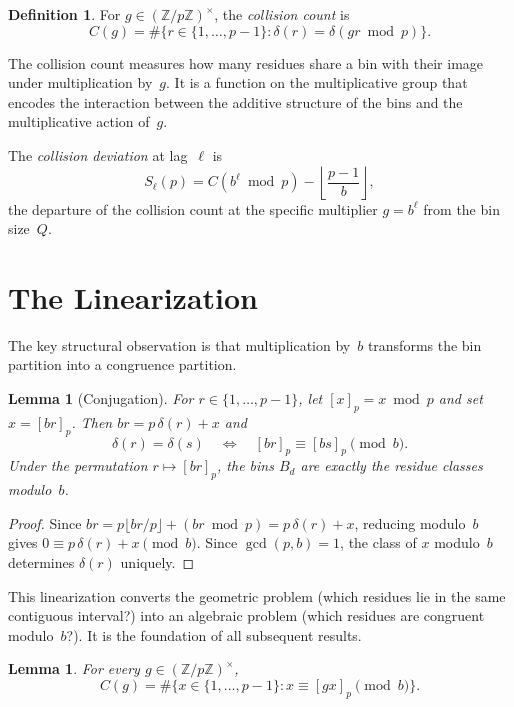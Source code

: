\documentclass[12pt]{amsart}
\newtheorem{lemma}[theorem]{Lemma}
\theoremstyle{definition}
\newtheorem{definition}[theorem]{Definition}
\theoremstyle{remark}
\begin{document}
\begin{definition}
For $g \in (\mathbb{Z}/p\mathbb{Z})^{\times}$, the
\emph{collision count} is
\[
C(g) = \#\{r \in \{1, \ldots, p{-}1\} :
\delta(r) = \delta(gr \bmod p)\}.
\]
\end{definition}

The collision count measures how many residues share a bin
with their image under multiplication by~$g$. It is a
function on the multiplicative group that encodes the
interaction between the additive structure of the bins and
the multiplicative action of~$g$.

The \emph{collision deviation} at lag~$\ell$ is
\[
S_{\ell}(p) = C(b^{\ell} \bmod p)
- \left\lfloor \frac{p-1}{b} \right\rfloor,
\]
the departure of the collision count at the specific
multiplier $g = b^{\ell}$ from the bin size~$Q$.

\section{The Linearization}

The key structural observation is that multiplication
by~$b$ transforms the bin partition into a congruence
partition.

\begin{lemma}[Conjugation]\label{lem:conjugation}
For $r \in \{1, \ldots, p{-}1\}$, let
$[x]_p = x \bmod p$ and set $x = [br]_p$.
Then $br = p\,\delta(r) + x$ and
\[
\delta(r) = \delta(s)
\quad\Longleftrightarrow\quad
[br]_p \equiv [bs]_p \pmod{b}.
\]
Under the permutation $r \mapsto [br]_p$, the bins
$B_d$ are exactly the residue classes modulo~$b$.
\end{lemma}

\begin{proof}
Since $br = p\lfloor br/p \rfloor + (br \bmod p)
= p\,\delta(r) + x$, reducing modulo~$b$ gives
$0 \equiv p\,\delta(r) + x \pmod{b}$. Since
$\gcd(p, b) = 1$, the class of $x$ modulo~$b$ determines
$\delta(r)$ uniquely.
\end{proof}

This linearization converts the geometric problem (which
residues lie in the same contiguous interval?) into an
algebraic problem (which residues are congruent
modulo~$b$?). It is the foundation of all subsequent
results.

\begin{lemma}\label{lem:collision-congruence}
For every $g \in (\mathbb{Z}/p\mathbb{Z})^{\times}$,
\[
C(g) = \#\{x \in \{1, \ldots, p{-}1\} :
x \equiv [gx]_p \pmod{b}\}.
\]
\end{lemma}
\end{document}
